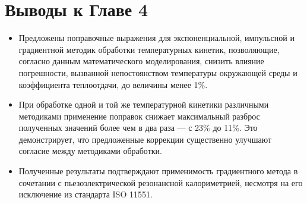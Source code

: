 \section{Выводы к Главе 4}

\begin{itemize}
	\item Предложены поправочные выражения для экспоненциальной, импульсной и градиентной методик обработки температурных кинетик, позволяющие, согласно данным математического моделирования, снизить влияние погрешности, вызванной непостоянством температуры окружающей среды и коэффициента теплоотдачи, до величины менее 1\%.
	\item При обработке одной и той же температурной кинетики различными методиками применение поправок снижает максимальный разброс полученных значений более чем в два раза — с 23\% до 11\%. Это демонстрирует, что предложенные коррекции существенно улучшают согласие между методиками обработки.
	\item Полученные результаты подтверждают применимость градиентного метода в сочетании с пьезоэлектрической резонансной калориметрией, несмотря на его исключение из стандарта ISO 11551.
\end{itemize}